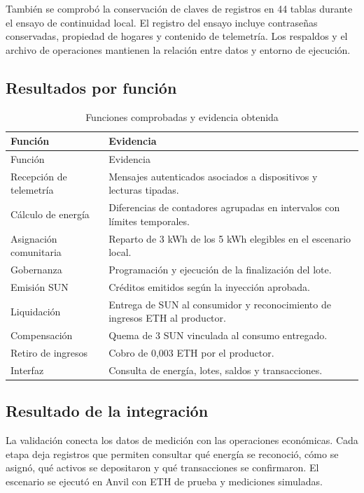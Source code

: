 También se comprobó la conservación de claves de registros en 44 tablas durante el ensayo de continuidad local. El registro del ensayo incluye contraseñas conservadas, propiedad de hogares y contenido de telemetría. Los respaldos y el archivo de operaciones mantienen la relación entre datos y entorno de ejecución.

\subsection{Resultados por función}
\begin{longtable}{L{.34\linewidth}L{.56\linewidth}}
\caption{Funciones comprobadas y evidencia obtenida}\label{tab:cumplimiento}\\
\toprule Función & Evidencia \\ \midrule\endfirsthead
\toprule Función & Evidencia \\ \midrule\endhead
Recepción de telemetría & Mensajes autenticados asociados a dispositivos y lecturas tipadas.\\
Cálculo de energía & Diferencias de contadores agrupadas en intervalos con límites temporales.\\
Asignación comunitaria & Reparto de 3 kWh de los 5 kWh elegibles en el escenario local.\\
Gobernanza & Programación y ejecución de la finalización del lote.\\
Emisión SUN & Créditos emitidos según la inyección aprobada.\\
Liquidación & Entrega de SUN al consumidor y reconocimiento de ingresos ETH al productor.\\
Compensación & Quema de 3 SUN vinculada al consumo entregado.\\
Retiro de ingresos & Cobro de 0,003 ETH por el productor.\\
Interfaz & Consulta de energía, lotes, saldos y transacciones.\\
\bottomrule
\end{longtable}

\subsection{Resultado de la integración}
La validación conecta los datos de medición con las operaciones económicas. Cada etapa deja registros que permiten consultar qué energía se reconoció, cómo se asignó, qué activos se depositaron y qué transacciones se confirmaron. El escenario se ejecutó en Anvil con ETH de prueba y mediciones simuladas.

